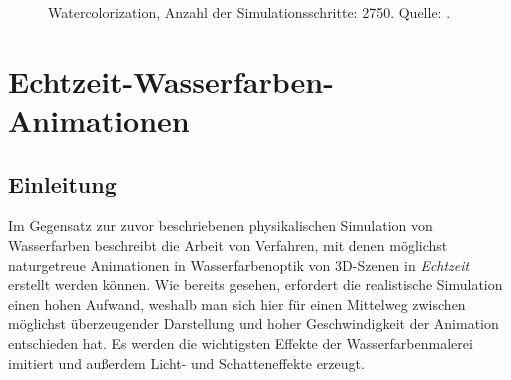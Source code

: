 \begin{figure}
  \centering {} 
  \caption{Watercolorization, Anzahl der Simulationsschritte: 2750. Quelle: \cite{Curtis1997}.}
  \label{fig:watercolorization}
\end{figure}

\section{Echtzeit-Wasserfarben-Animationen}
\label{sec:echtzeit-wasserfarben}

\subsection{Einleitung}
Im Gegensatz zur zuvor beschriebenen physikalischen Simulation von Wasserfarben 
beschreibt die Arbeit von \cite{Luft2006} Verfahren, mit denen möglichst 
naturgetreue Animationen in Wasserfarbenoptik von 3D-Szenen in 
\textsl{Echtzeit} erstellt werden können. Wie bereits gesehen, erfordert die 
realistische Simulation einen hohen Aufwand, weshalb man sich hier für einen 
Mittelweg zwischen möglichst überzeugender Darstellung und hoher 
Geschwindigkeit der Animation entschieden hat. Es werden die wichtigsten 
Effekte der Wasserfarbenmalerei imitiert und außerdem Licht- und 
Schatteneffekte erzeugt.

